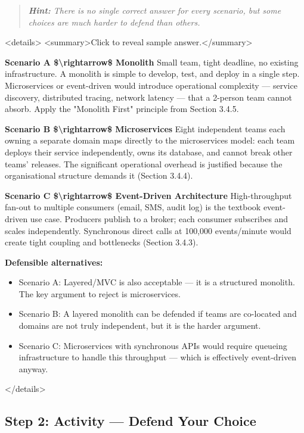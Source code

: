 \documentclass[11pt,a4paper]{book}
\begin{document}
\begin{quote}
\textit{\textbf{Hint:} There is no single correct answer for every scenario, but some choices are much harder to defend than others.}
\end{quote}

<details>
<summary>Click to reveal sample answer.</summary>

\textbf{Scenario A \$\textbackslash{}rightarrow\$ Monolith}
Small team, tight deadline, no existing infrastructure. A monolith is simple to develop, test, and deploy in a single step. Microservices or event-driven would introduce operational complexity --- service discovery, distributed tracing, network latency --- that a 2-person team cannot absorb. Apply the "Monolith First" principle from Section 3.4.5.

\textbf{Scenario B \$\textbackslash{}rightarrow\$ Microservices}
Eight independent teams each owning a separate domain maps directly to the microservices model: each team deploys their service independently, owns its database, and cannot break other teams' releases. The significant operational overhead is justified because the organisational structure demands it (Section 3.4.4).

\textbf{Scenario C \$\textbackslash{}rightarrow\$ Event-Driven Architecture}
High-throughput fan-out to multiple consumers (email, SMS, audit log) is the textbook event-driven use case. Producers publish to a broker; each consumer subscribes and scales independently. Synchronous direct calls at 100,000 events/minute would create tight coupling and bottlenecks (Section 3.4.3).

\textbf{Defensible alternatives:}
\begin{itemize}
  \item Scenario A: Layered/MVC is also acceptable --- it is a structured monolith. The key argument to reject is microservices.
  \item Scenario B: A layered monolith can be defended if teams are co-located and domains are not truly independent, but it is the harder argument.
  \item Scenario C: Microservices with synchronous APIs would require queueing infrastructure to handle this throughput --- which is effectively event-driven anyway.
\end{itemize}

</details>

\subsection{Step 2: Activity --- Defend Your Choice}
\end{document}
